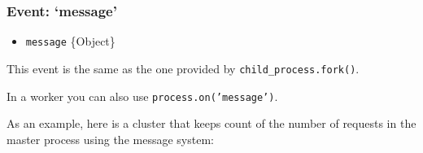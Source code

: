 \subsubsection{Event: `message'}\label{event-message}

\begin{itemize}
\itemsep1pt\parskip0pt
\item
  \texttt{message} \{Object\}
\end{itemize}

This event is the same as the one provided by
\texttt{child\_process.fork()}.

In a worker you can also use \texttt{process.on('message')}.

As an example, here is a cluster that keeps count of the number of
requests in the master process using the message system:

